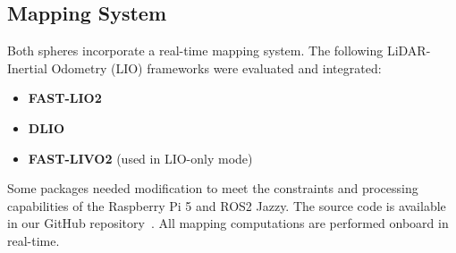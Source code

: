 \documentclass[a4paper, conference]{IEEEtran}
\begin{document}
\subsection{Mapping System}
Both spheres incorporate a real-time mapping system. 
The following LiDAR-Inertial Odometry (LIO) frameworks were evaluated and integrated:
\begin{itemize}
    \item \textbf{FAST-LIO2}
    \item \textbf{DLIO}
    \item \textbf{FAST-LIVO2} (used in LIO-only mode)
\end{itemize}
Some packages needed modification to meet the constraints and processing capabilities of the Raspberry Pi 5 and ROS2 Jazzy.
The source code is available in our GitHub repository~\cite{githubsphere}.
All mapping computations are performed onboard in real-time.
\end{document}
